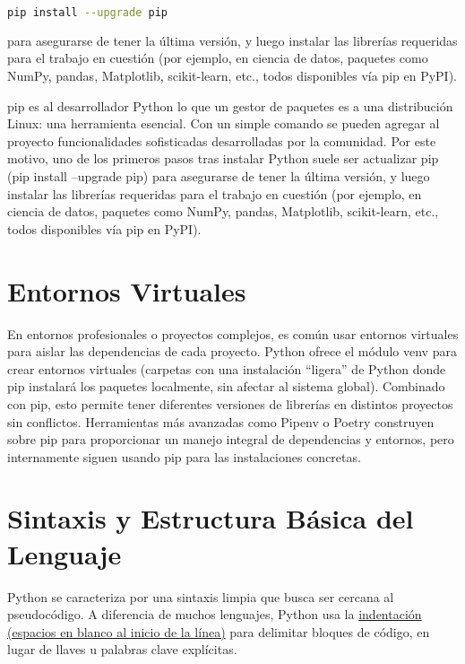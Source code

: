 \begin{lstlisting}[language=bash, caption={Actualización de pip}]
pip install --upgrade pip
\end{lstlisting}

para asegurarse de tener la última versión, y luego instalar las librerías requeridas 
para el trabajo en cuestión (por ejemplo, en ciencia de datos, paquetes como NumPy, pandas, 
Matplotlib, scikit-learn, etc., todos disponibles vía pip en PyPI).


pip es al desarrollador Python lo que un gestor de paquetes es a una distribución Linux: una herramienta esencial. 
Con un simple comando se pueden agregar al proyecto funcionalidades sofisticadas desarrolladas por la comunidad. 
Por este motivo, uno de los primeros pasos tras instalar Python suele ser actualizar pip (pip install --upgrade pip)
 para asegurarse de tener la última versión, y luego instalar las librerías requeridas para el trabajo en cuestión 
 (por ejemplo, en ciencia de datos, paquetes como NumPy, pandas, Matplotlib, scikit-learn, etc., todos disponibles vía pip en PyPI).

\section{Entornos Virtuales}
En entornos profesionales o proyectos complejos, es común usar entornos virtuales para aislar las dependencias 
de cada proyecto. Python ofrece el módulo venv para crear entornos virtuales (carpetas con una instalación “ligera” 
de Python donde pip instalará los paquetes localmente, sin afectar al sistema global). Combinado con pip, esto permite 
tener diferentes versiones de librerías en distintos proyectos sin conflictos. 
Herramientas más avanzadas como Pipenv o Poetry construyen sobre pip para proporcionar un manejo integral de dependencias 
y entornos, pero internamente siguen usando pip para las instalaciones concretas.

\section{Sintaxis y Estructura Básica del Lenguaje}

Python se caracteriza por una sintaxis limpia que busca ser cercana al pseudocódigo. 
A diferencia de muchos lenguajes, Python usa la 
\href{https://python-course.eu/python-tutorial/structuring-indentation.php}{indentación (espacios en blanco al inicio de la línea)} 
para delimitar bloques de código, en lugar de llaves u palabras clave explícitas. 

